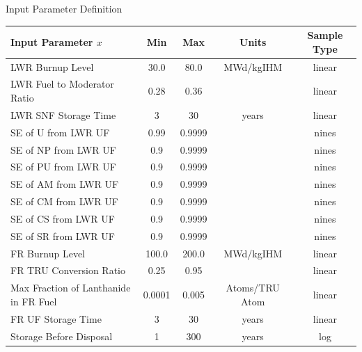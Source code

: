 \documentclass[pdf, autumn, slideColor, nocolorBG]{prosper}
\begin{document}
\begin{slide}{Input Parameter Definition}
\tiny
\begin{center}
\begin{tabular}{|l||c|c|c|c|}
\hline
\textbf{Input Parameter $x$} & \textbf{Min} & \textbf{Max} & \textbf{Units} & \textbf{Sample Type}\\
\hline
LWR Burnup Level & 30.0 & 80.0 & MWd/kgIHM & linear \\
\hline
LWR Fuel to Moderator Ratio & 0.28 & 0.36 & & linear \\
\hline
LWR SNF Storage Time & 3 & 30 & years & linear \\
\hline
SE of U from LWR UF & 0.99 & 0.9999 & & nines \\
\hline
SE of NP from LWR UF & 0.9 & 0.9999 & & nines \\
\hline
SE of PU from LWR UF & 0.9 & 0.9999 & & nines \\
\hline
SE of AM from LWR UF & 0.9 & 0.9999 & & nines \\
\hline
SE of CM from LWR UF & 0.9 & 0.9999 & & nines \\
\hline
SE of CS from LWR UF & 0.9 & 0.9999 & & nines \\
\hline
SE of SR from LWR UF & 0.9 & 0.9999 & & nines \\
\hline
FR Burnup Level & 100.0 & 200.0 & MWd/kgIHM & linear\\
\hline
FR TRU Conversion Ratio & 0.25 & 0.95 & & linear \\
\hline
Max Fraction of Lanthanide in FR Fuel & 0.0001 & 0.005 & Atoms/TRU Atom & linear \\
\hline
FR UF Storage Time & 3 & 30 & years & linear \\
\hline
Storage Before Disposal & 1 & 300 & years & log \\
\hline
\end{tabular}
\end{center}
\end{slide}
\end{document}
